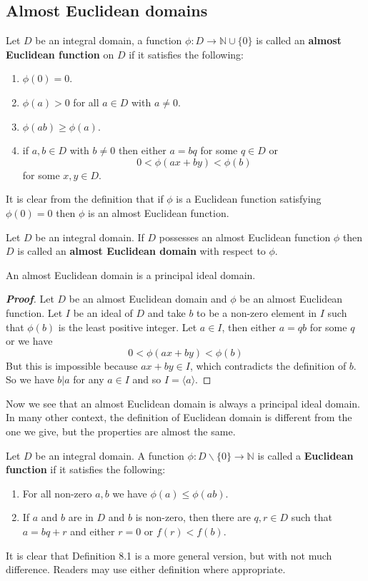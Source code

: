 \subsection{Almost Euclidean domains}
\begin{definition} Let $D$ be an integral domain, a function $\phi:D \rightarrow \mathbb{N} \cup \{0\}$
is called an {\bf almost Euclidean function} on $D$ if it satisfies the following:
\begin{enumerate}
\item $\phi(0)=0$.
\item $\phi(a) >0$ for all $a \in D$ with $a \neq 0$.
\item $\phi(ab) \ge \phi(a)$.
\item if $a,b \in D$ with $b \neq 0$ then either $a=bq$ for some $q \in D$ or
$$0<\phi(ax+by)<\phi(b)$$ for some $x,y \in D$.
\end{enumerate}
\end{definition}
It is clear from the definition that if $\phi$ is a Euclidean function satisfying $\phi(0)=0$ then $\phi$ is an almost Euclidean function.
\begin{definition} Let $D$ be an integral domain. If $D$ possesses an almost Euclidean function $\phi$ then $D$ is called an {\bf almost Euclidean domain} with respect to $\phi$.
\end{definition}
\begin{theorem} An almost Euclidean domain is a principal ideal domain.
\end{theorem}
\begin{proof}[\bf Proof] Let $D$ be an almost Euclidean domain and $\phi$ be an almost Euclidean function. Let $I$ be an ideal of $D$ and take $b$ to be a non-zero element in $I$ such that $\phi(b)$ is the least positive integer. Let $a \in I$, then either $a=qb$ for some $q$ or we have
$$0<\phi(ax+by)<\phi(b)$$
But this is impossible because $ax+by \in I$, which contradicts the definition of $b$. So we have $b|a$ for any $a \in I$ and so $I=\langle a \rangle$.
\end{proof}
Now we see that an almost Euclidean domain is always a principal ideal domain. In many other context, the definition of Euclidean domain is different from the one we give, but the properties are almost the same.
\begin{definition} Let $D$ be an integral domain. A function $\phi:D \backslash\{0\} \rightarrow \mathbb{N}$ is called a {\bf Euclidean function} if it satisfies the following:
\begin{enumerate}
\item For all non-zero $a,b$ we have $\phi(a) \le \phi(ab)$.
\item  If $a$ and $b$ are in $D$ and $b$ is non-zero, then there are $q,r \in D$ such that $a = bq + r$ and either $r = 0$ or $f(r) < f(b)$.
\end{enumerate}
\end{definition}
It is clear that Definition 8.1 is a more general version, but with not much difference. Readers may use either definition where appropriate.
